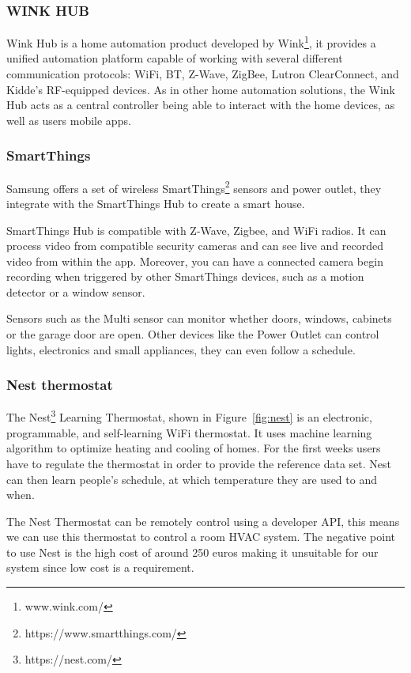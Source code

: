 \subsubsection{WINK HUB}

Wink Hub is a home automation product developed by Wink\footnote{www.wink.com/}, it provides a unified automation platform capable of working with several different communication protocols: \ac{WiFi}, \ac{BT}, Z-Wave, ZigBee, Lutron ClearConnect, and Kidde's RF-equipped devices.
As in other home automation solutions, the Wink Hub acts as a central controller being able to interact with the home devices, as well as users mobile apps.

\subsubsection{SmartThings}

Samsung offers a set of wireless SmartThings\footnote{https://www.smartthings.com/} sensors and power outlet, they integrate with the SmartThings Hub to create a smart house.

SmartThings Hub is compatible with Z-Wave, Zigbee, and \ac{WiFi} radios. It can process video from compatible security cameras and can see live and recorded video from within the app. Moreover, you can have a connected camera begin recording when triggered by other SmartThings devices, such as a motion detector or a window sensor. 


Sensors such as the Multi sensor can monitor whether doors, windows, cabinets or the garage door are open. Other devices like the Power Outlet can control lights, electronics and small appliances, they can even follow a schedule.




\subsubsection{Nest thermostat}

The Nest\footnote{https://nest.com/} Learning Thermostat, shown in Figure~\ref{fig:nest} is an electronic, programmable, and self-learning \ac{WiFi} thermostat. It uses machine learning algorithm to optimize  heating and cooling of homes. For the first weeks users have to regulate the thermostat in order to provide the reference data set. Nest can then learn people's schedule, at which temperature they are used to and when. 

The Nest Thermostat can be remotely control using a developer \ac{API}, this means we can use this thermostat to control a room \ac{HVAC} system. The negative point to use Nest is the high cost of around 250 euros making it unsuitable for our system since low cost is a requirement. 

